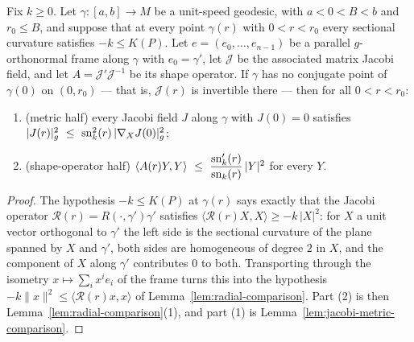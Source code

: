\begin{lemma}
\label{lem:frame-sectional-comparison}





Fix $k\ge0$. Let $\gamma\colon[a,b]\to M$ be a unit-speed geodesic, with
$a<0<B<b$ and $r_0\le B$, and suppose that at every point $\gamma(r)$ with
$0<r<r_0$ every sectional curvature satisfies $-k\le K(P)$. Let
$e=(e_0,\ldots,e_{n-1})$ be a parallel $g$-orthonormal frame along $\gamma$
with $e_0=\gamma'$, let $\mathcal J$ be the associated matrix Jacobi field,
and let $A=\mathcal J'\mathcal J^{-1}$ be its shape operator. If $\gamma$ has
no conjugate point of $\gamma(0)$ on $(0,r_0)$ --- that is, $\mathcal J(r)$ is
invertible there --- then for all $0<r<r_0$:
\begin{enumerate}
\item (metric half) every Jacobi field $J$ along $\gamma$ with $J(0)=0$
satisfies $|J(r)|_g^2\ \le\ \sn_k^2(r)\,|\nabla_XJ(0)|_g^2$;
\item (shape-operator half)
$\langle A(r)Y,Y\rangle\ \le\ \dfrac{\operatorname{sn}_k'(r)}{\operatorname{sn}_k(r)}\,|Y|^2$ for every $Y$.
\end{enumerate}
\end{lemma}

\begin{proof}
\sketch
{}

The hypothesis $-k\le K(P)$ at $\gamma(r)$ says exactly that the Jacobi operator
$\mathcal R(r)=R(\cdot,\gamma')\gamma'$ satisfies
$\langle\mathcal R(r)X,X\rangle\ge-k\,|X|^2$: for $X$ a unit vector orthogonal to
$\gamma'$ the left side is the sectional curvature of the plane spanned by $X$ and
$\gamma'$, both sides are homogeneous of degree $2$ in $X$, and the component of
$X$ along $\gamma'$ contributes $0$ to both. Transporting through the isometry
$x\mapsto\sum_ix^ie_i$ of the frame turns this into the hypothesis
$-k\|x\|^2\le\langle\mathcal R(r)x,x\rangle$ of
Lemma~\ref{lem:radial-comparison}. Part (2) is then
Lemma~\ref{lem:radial-comparison}(1), and part (1) is
Lemma~\ref{lem:jacobi-metric-comparison}.
\end{proof}

